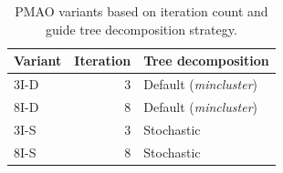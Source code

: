 \begin{table}[!htbp]
	\small
	\caption{PMAO variants based on iteration count and guide tree decomposition strategy. }
	\begin{tabular}{l|r|l}
		Variant & Iteration & Tree decomposition\\
		\hline
		3I-D  & 3     & Default (\textit{mincluster}) \\
		\hline
		8I-D  & 8     & Default (\textit{mincluster}) \\
		\hline
		3I-S  & 3     & Stochastic \\
		\hline
		8I-S  & 8     & Stochastic\\
	\end{tabular}%
	\label{tab:variants}%
\end{table}%

